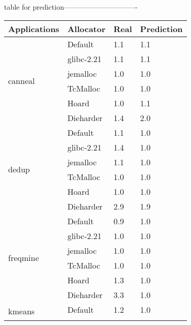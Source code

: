 
table for prediction-------------------------------

\begin{table}[]
\begin{tabular}{|l|l|l|l|}
\hline
Applications                    & Allocator  & Real & Prediction \\ \hline
\multirow{6}{*}{canneal}        & Default    & 1.1  & 1.1        \\ \cline{2-4} 
                                & glibc-2.21 & 1.1  & 1.1        \\ \cline{2-4} 
                                & jemalloc   & 1.0  & 1.0        \\ \cline{2-4} 
                                & TcMalloc   & 1.0  & 1.0        \\ \cline{2-4} 
                                & Hoard      & 1.0  & 1.1        \\ \cline{2-4} 
                                & Dieharder  & 1.4  & 2.0        \\ \hline
\multirow{6}{*}{dedup}          & Default    & 1.1  & 1.0        \\ \cline{2-4} 
                                & glibc-2.21 & 1.4  & 1.0        \\ \cline{2-4} 
                                & jemalloc   & 1.1  & 1.0        \\ \cline{2-4} 
                                & TcMalloc   & 1.0  & 1.0        \\ \cline{2-4} 
                                & Hoard      & 1.0  & 1.0        \\ \cline{2-4} 
                                & Dieharder  & 2.9  & 1.9        \\ \hline
\multirow{6}{*}{freqmine}       & Default    & 0.9  & 1.0        \\ \cline{2-4} 
                                & glibc-2.21 & 1.0  & 1.0        \\ \cline{2-4} 
                                & jemalloc   & 1.0  & 1.0        \\ \cline{2-4} 
                                & TcMalloc   & 1.0  & 1.0        \\ \cline{2-4} 
                                & Hoard      & 1.3  & 1.0        \\ \cline{2-4} 
                                & Dieharder  & 3.3  & 1.0        \\ \hline
\multirow{6}{*}{kmeans}         & Default    & 1.2  & 1.0        \\ \cline{2-4} 

\end{tabular}
\end{table}

